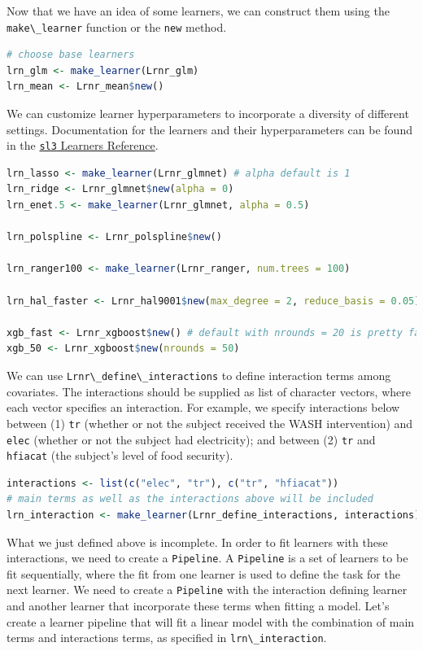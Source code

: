 \documentclass[
  12pt, krantz2,
]{krantz}
\newcommand{\passthrough}[1]{#1}
\newcommand{\1}{\mathbbm{1}}
\theoremstyle{definition}
\theoremstyle{definition}
\theoremstyle{definition}
\theoremstyle{definition}
\theoremstyle{remark}
\begin{document}
Now that we have an idea of some learners, we can construct them using the
\passthrough{\lstinline!make\_learner!} function or the \passthrough{\lstinline!new!} method.

\begin{lstlisting}[language=R]
# choose base learners
lrn_glm <- make_learner(Lrnr_glm)
lrn_mean <- Lrnr_mean$new()
\end{lstlisting}

We can customize learner hyperparameters to incorporate a diversity of different
settings. Documentation for the learners and their hyperparameters can be found
in the \href{https://tlverse.org/sl3/reference/index.html\#section-sl-learners}{\passthrough{\lstinline!sl3!} Learners
Reference}.

\begin{lstlisting}[language=R]
lrn_lasso <- make_learner(Lrnr_glmnet) # alpha default is 1
lrn_ridge <- Lrnr_glmnet$new(alpha = 0)
lrn_enet.5 <- make_learner(Lrnr_glmnet, alpha = 0.5)

lrn_polspline <- Lrnr_polspline$new()

lrn_ranger100 <- make_learner(Lrnr_ranger, num.trees = 100)

lrn_hal_faster <- Lrnr_hal9001$new(max_degree = 2, reduce_basis = 0.05)

xgb_fast <- Lrnr_xgboost$new() # default with nrounds = 20 is pretty fast
xgb_50 <- Lrnr_xgboost$new(nrounds = 50)
\end{lstlisting}

We can use \passthrough{\lstinline!Lrnr\_define\_interactions!} to define interaction terms among
covariates. The interactions should be supplied as list of character vectors,
where each vector specifies an interaction. For example, we specify
interactions below between (1) \passthrough{\lstinline!tr!} (whether or not the subject received the
WASH intervention) and \passthrough{\lstinline!elec!} (whether or not the subject had electricity); and
between (2) \passthrough{\lstinline!tr!} and \passthrough{\lstinline!hfiacat!} (the subject's level of food security).

\begin{lstlisting}[language=R]
interactions <- list(c("elec", "tr"), c("tr", "hfiacat"))
# main terms as well as the interactions above will be included
lrn_interaction <- make_learner(Lrnr_define_interactions, interactions)
\end{lstlisting}

What we just defined above is incomplete. In order to fit learners with these
interactions, we need to create a \passthrough{\lstinline!Pipeline!}. A \passthrough{\lstinline!Pipeline!} is a set of learners
to be fit sequentially, where the fit from one learner is used to define the
task for the next learner. We need to create a \passthrough{\lstinline!Pipeline!} with the interaction
defining learner and another learner that incorporate these terms when fitting
a model. Let's create a learner pipeline that will fit a linear model with the
combination of main terms and interactions terms, as specified in
\passthrough{\lstinline!lrn\_interaction!}.
\end{document}

